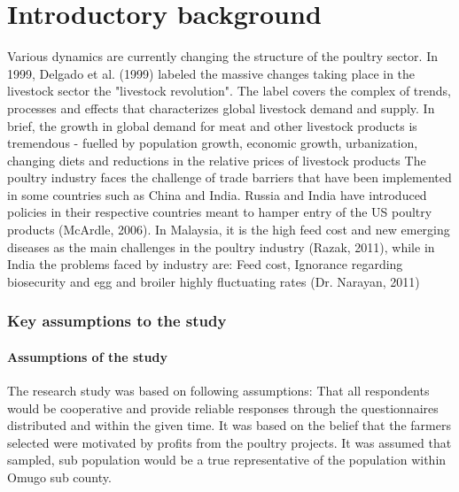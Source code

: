 \chapter{Introductory background }

Various dynamics are currently changing the structure of the poultry sector. In 1999, Delgado et al. (1999) labeled the massive changes taking place in the livestock sector the "livestock revolution". The label covers the complex of trends, processes and effects that characterizes global livestock demand and supply. In brief, the growth in global demand for meat and other livestock products is tremendous - fuelled by population growth, economic growth, urbanization, changing diets and reductions in the relative prices of livestock products
The poultry industry faces the challenge of trade barriers that have been implemented in some countries such as China and India. Russia and India have introduced policies in their respective countries meant to hamper entry of the US poultry products (McArdle, 2006). In Malaysia, it is the high feed cost and new emerging diseases as the main challenges in the poultry industry (Razak, 2011), while in India the problems faced by industry are: Feed cost, Ignorance regarding biosecurity and egg and broiler highly fluctuating rates (Dr. Narayan, 2011)

\subsection{Key assumptions to the study}

\subsubsection{Assumptions of the study}
The research study was based on following assumptions: That all respondents would be cooperative and provide reliable responses through the questionnaires distributed and within the given time. It was based on the belief that the farmers selected were motivated by profits from the poultry projects. It was assumed that sampled, sub population would be a true representative of the population within Omugo sub county.



